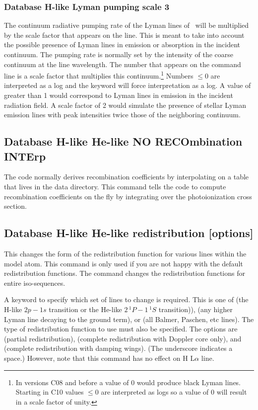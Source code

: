 \subsubsection{Database H-like Lyman pumping scale 3}
The continuum radiative pumping rate
of the Lyman lines of \hi\ will be multiplied by the scale factor
that appears on the line.
This is meant to take into account the possible presence of
Lyman lines in emission or absorption in the incident continuum.
The pumping
rate is normally set by the intensity of the coarse continuum at the line
wavelength.
The number that appears on the command line is a scale factor
that multiplies this continuum.\footnote{In versions C08 and before a value of 0 would produce black Lyman lines.
Starting in C10 values $\le 0$ are interpreted as logs
so a value of 0 will result in a scale factor of unity.}
Numbers $\le 0$ are interpreted as a log and
the  keyword will force interpretation as a log.
A value of greater than 1 would correspond to Lyman lines
in emission in the incident radiation field.
A scale factor of 
2 would simulate the presence of stellar Lyman emission lines with peak
intensities twice those of the neighboring continuum.

\subsection{Database H-like \OR{} He-like NO RECOmbination INTErp}

The code normally derives recombination coefficients by interpolating
on a table that lives in the data directory.
This command tells the code
to compute recombination coefficients on the fly by integrating over the
photoionization cross section.

\subsection{Database H-like \OR{} He-like  redistribution [options]}

This changes the form of the redistribution function for various
lines within the model atom. This command is only used if you are
not happy with the default redistribution functions. The command
changes the redistribution functions for entire iso-sequences.

A keyword to specify which set of lines to change is required.
This is one of  (the H-like $2p - 1s$ transition or the He-like
$2\, ^1P - 1\, ^1S$ transition)),  (any higher Lyman line
decaying to the ground term), or 
(all Balmer, Paschen, etc lines).
The type of redistribution function to use must also be specified.
The options are  (partial redistribution),  (complete redistribution
with Doppler core only), and 
(complete redistribution with damping wings).
(The underscore indicates a space.)
However, note that this command has no effect on H L$\alpha$ line.

